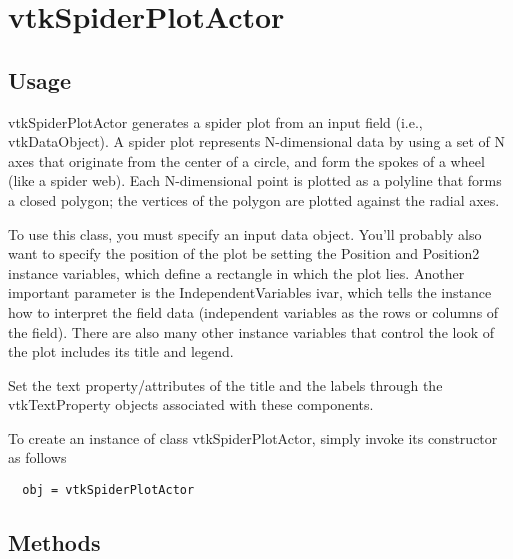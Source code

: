 \section{vtkSpiderPlotActor}

\subsection{Usage}

 vtkSpiderPlotActor generates a spider plot from an input field (i.e.,
 vtkDataObject). A spider plot represents N-dimensional data by using a set
 of N axes that originate from the center of a circle, and form the spokes
 of a wheel (like a spider web).  Each N-dimensional point is plotted as a
 polyline that forms a closed polygon; the vertices of the polygon
 are plotted against the radial axes.

 To use this class, you must specify an input data object. You'll probably
 also want to specify the position of the plot be setting the Position and
 Position2 instance variables, which define a rectangle in which the plot
 lies. Another important parameter is the IndependentVariables ivar, which
 tells the instance how to interpret the field data (independent variables
 as the rows or columns of the field). There are also many other instance
 variables that control the look of the plot includes its title and legend.

 Set the text property/attributes of the title and the labels through the 
 vtkTextProperty objects associated with these components.

To create an instance of class vtkSpiderPlotActor, simply
invoke its constructor as follows
\begin{verbatim}
  obj = vtkSpiderPlotActor
\end{verbatim}
\subsection{Methods}

